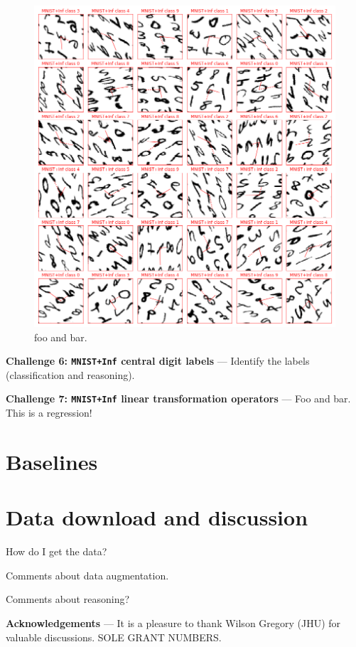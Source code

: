 \documentclass{article}
\renewcommand{\paragraph}[1]{\par\medskip\noindent\textbf{#1} ---}
\begin{document}
\begin{figure}[t!]
\includegraphics[width=\textwidth]{../notebooks/MNIST+Inf.png}
\caption{foo and bar.\label{fig:Inf}}
\end{figure}

\paragraph{Challenge 6: \texttt{MNIST+Inf} central digit labels}
Identify the labels (classification and reasoning).

\paragraph{Challenge 7: \texttt{MNIST+Inf} linear transformation operators}
Foo and bar. This is a regression!

\section{Baselines}

\section{Data download and discussion}

How do I get the data?

Comments about data augmentation.

Comments about reasoning?

\paragraph{Acknowledgements}
It is a pleasure to thank
  Wilson Gregory (JHU)
for valuable discussions.
SOLE GRANT NUMBERS.


\raggedright

\end{document}
